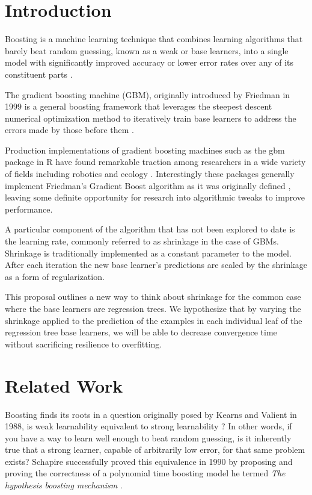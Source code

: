 \documentclass[9pt, conference]{IEEEtran}
\begin{document}
\section{Introduction}

Boosting is a machine learning technique that combines learning algorithms that barely beat random guessing, known as a weak or base learners, into a single model with significantly improved accuracy or lower error rates over any of its constituent parts \cite{StrengthOfWeak}  \cite{BoostingSurvey}. 

The gradient boosting machine (GBM), originally introduced by Friedman in 1999 is a general boosting framework that leverages the steepest descent numerical optimization method to iteratively train base learners to address the errors made by those before them \cite{2001Friedman}.

Production implementations of gradient boosting machines such as the gbm package in R have found remarkable traction among researchers in a wide variety of fields including robotics and ecology \cite{GBMTut} \cite{ecological}. Interestingly these packages generally implement Friedman's Gradient Boost algorithm as it was originally defined \cite{2012ridgeway}, leaving some definite opportunity for research into algorithmic tweaks to improve performance. 

A particular component of the algorithm that has not been explored to date is the learning rate, commonly referred to as shrinkage in the case of GBMs. Shrinkage is traditionally implemented as a constant parameter to the model. After each iteration the new base learner's predictions are scaled by the shrinkage as a form of regularization. 

This proposal outlines a new way to think about shrinkage for the common case where the base learners are regression trees. We hypothesize that by varying the shrinkage applied to the prediction of the examples in each individual leaf of the regression tree base learners, we will be able to decrease convergence time without sacrificing resilience to overfitting.

\section{Related Work}
\label{sec:RelatedWork}
Boosting finds its roots in a question originally posed by Kearns and Valient in 1988, is weak learnability equivalent to strong learnability\cite{Kearns:1988} \cite{KearnsValient:1989}? In other words, if you have a way to learn well enough to beat random guessing, is it inherently true that a strong learner, capable of arbitrarily low error, for that same problem exists? Schapire successfully proved this equivalence in 1990 by proposing and proving the correctness of a polynomial time boosting model he termed \textit{The hypothesis boosting mechanism} \cite{StrengthOfWeak}. 
\end{document}
